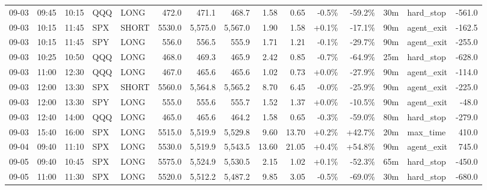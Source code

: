 \documentclass[11pt,a4paper,twoside]{article}
\begin{document}
\begin{landscape}
\begin{center}
\begin{longtable}{>{\color{txtmain}}l l l l l r r r r r r r r >{\color{txtmain}}l r}
09-03 & 09:45 & 10:15 & QQQ & LONG & 472.0 & 471.1 & 468.7 & 1.58 & 0.65 & \textcolor{lossred}{-0.5\%} & \textcolor{lossred}{-59.2\%} & 30m & hard\_stop & \textcolor{lossred}{-561.0} \\
09-03 & 10:15 & 11:45 & SPX & SHORT & 5530.0 & 5,575.0 & 5,567.0 & 1.90 & 1.58 & \textcolor{wingreen}{+0.1\%} & \textcolor{lossred}{-17.1\%} & 90m & agent\_exit & \textcolor{lossred}{-162.5} \\
09-03 & 10:15 & 11:45 & SPY & LONG & 556.0 & 556.5 & 555.9 & 1.71 & 1.21 & \textcolor{lossred}{-0.1\%} & \textcolor{lossred}{-29.7\%} & 90m & agent\_exit & \textcolor{lossred}{-255.0} \\
09-03 & 10:25 & 10:50 & QQQ & LONG & 468.0 & 469.3 & 465.9 & 2.42 & 0.85 & \textcolor{lossred}{-0.7\%} & \textcolor{lossred}{-64.9\%} & 25m & hard\_stop & \textcolor{lossred}{-628.0} \\
09-03 & 11:00 & 12:30 & QQQ & LONG & 467.0 & 465.6 & 465.6 & 1.02 & 0.73 & \textcolor{wingreen}{+0.0\%} & \textcolor{lossred}{-27.9\%} & 90m & agent\_exit & \textcolor{lossred}{-114.0} \\
09-03 & 12:00 & 13:30 & SPX & SHORT & 5560.0 & 5,564.8 & 5,565.2 & 8.70 & 6.45 & \textcolor{lossred}{-0.0\%} & \textcolor{lossred}{-25.9\%} & 90m & agent\_exit & \textcolor{lossred}{-225.0} \\
09-03 & 12:00 & 13:30 & SPY & LONG & 555.0 & 555.6 & 555.7 & 1.52 & 1.37 & \textcolor{wingreen}{+0.0\%} & \textcolor{lossred}{-10.5\%} & 90m & agent\_exit & \textcolor{lossred}{-48.0} \\
09-03 & 12:40 & 14:00 & QQQ & LONG & 465.0 & 465.6 & 464.2 & 1.58 & 0.65 & \textcolor{lossred}{-0.3\%} & \textcolor{lossred}{-59.0\%} & 80m & hard\_stop & \textcolor{lossred}{-279.0} \\
09-03 & 15:40 & 16:00 & SPX & LONG & 5515.0 & 5,519.9 & 5,529.8 & 9.60 & 13.70 & \textcolor{wingreen}{+0.2\%} & \textcolor{wingreen}{+42.7\%} & 20m & max\_time & \textcolor{wingreen}{410.0} \\
09-04 & 09:40 & 11:10 & SPX & LONG & 5530.0 & 5,519.9 & 5,543.5 & 13.60 & 21.05 & \textcolor{wingreen}{+0.4\%} & \textcolor{wingreen}{+54.8\%} & 90m & agent\_exit & \textcolor{wingreen}{745.0} \\
09-05 & 09:40 & 10:45 & SPX & LONG & 5575.0 & 5,524.9 & 5,530.5 & 2.15 & 1.02 & \textcolor{wingreen}{+0.1\%} & \textcolor{lossred}{-52.3\%} & 65m & hard\_stop & \textcolor{lossred}{-450.0} \\
09-05 & 11:00 & 11:30 & SPX & LONG & 5520.0 & 5,512.2 & 5,487.2 & 9.85 & 3.05 & \textcolor{lossred}{-0.5\%} & \textcolor{lossred}{-69.0\%} & 30m & hard\_stop & \textcolor{lossred}{-680.0} \\

\end{longtable}
\end{center}
\end{landscape}
\end{document}
